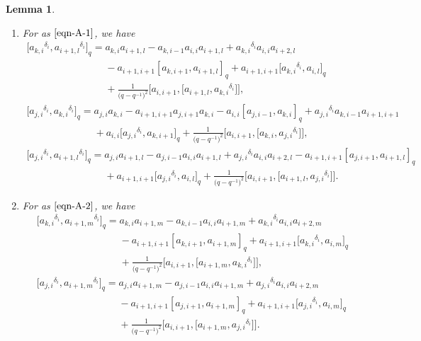 \documentclass[pdftex]{sigma}
\numberwithin{equation}{section}
\def\lr#1{\left[#1\right]}
\def\d{\delta}
\def\A{\mathscr{A}}
\newtheorem{Lemma}[Theorem]{Lemma}
\begin{document}
\begin{Lemma}
\begin{enumerate}
\begin{gather}
\end{gather}
\item[$(2)$] For \smash{$\A_{j,k,i+1}^{k-1,i,l}$} as $\eqref{eqn-A-1}$, we have
\begin{gather}
\bigl[{a_{k,i}}^{\d_i},{a_{i+1,l}}^{\d_i}\bigr]_q
=a_{k,i}a_{i+1,l}-a_{k,i-1}a_{i,i}a_{i+1,l} +{a_{k,i}}^{\d_i}a_{i,i}a_{i+2,l}\nonumber \\
\phantom{\bigl[{a_{k,i}}^{\d_i},{a_{i+1,l}}^{\d_i}\bigr]_q
=}{}-a_{i+1,i+1}\lr{a_{k,i+1},a_{i+1,l}}_q
+a_{i+1,i+1}\bigl[{a_{k,i}}^{\d_i},a_{i,l}\bigr]_q\nonumber \\
\phantom{\bigl[{a_{k,i}}^{\d_i},{a_{i+1,l}}^{\d_i}\bigr]_q
=}{} +\frac{1}{\bigl(q-q^{-1}\bigr)^2}\bigl[a_{i,i+1},\bigl[a_{i+1,l},{a_{k,i}}^{\d_i}\bigr]\bigr], \label{ri-1} \\
\bigl[{a_{j,i}}^{\d_i},{a_{k,i}}^{\d_i}\bigr]_q=a_{j,i}a_{k,i} -a_{i+1,i+1}a_{j,i+1}a_{k,i}-a_{i,i}\lr{a_{j,i-1},a_{k,i}}_q +{a_{j,i}}^{\d_i}a_{k,i-1}a_{i+1,i+1}\nonumber \\
\phantom{\bigl[{a_{j,i}}^{\d_i},{a_{k,i}}^{\d_i}\bigr]_q=}{}
+a_{i,i}\bigl[{a_{j,i}}^{\d_i}, a_{k,i+1}]_q +\frac{1}{\bigl(q-q^{-1}\bigr)^2}\bigl[a_{i,i+1},\bigl[a_{k,i},{a_{j,i}}^{\d_i}\bigr]\bigr], \label{ri-2} \\
\bigl[{a_{j,i}}^{\d_i}, {a_{i+1,l}}^{\d_i}\bigr]_q = a_{j,i}a_{i+1,l} -a_{j,i-1}a_{i,i}a_{i+1,l}+{a_{j,i}}^{\d_i}a_{i,i}a_{i+2,l} -a_{i+1,i+1}[a_{j,i+1},a_{i+1,l}]_q\nonumber \\
\phantom{\bigl[{a_{j,i}}^{\d_i}, {a_{i+1,l}}^{\d_i}\bigr]_q = }{}
+a_{i+1,i+1}\bigl[{a_{j,i}}^{\d_i},a_{i,l}\bigr]_q +\frac{1}{\bigl(q-q^{-1}\bigr)^2}\bigl[a_{i,i+1},\bigl[a_{i+1,l},{a_{j,i}}^{\d_i}\bigr]\bigr]. \label{ri-3}
\end{gather}
\item[$(3)$] For \smash{$\A_{j,k,i+1}^{i,l,m}$} as $\eqref{eqn-A-2}$, we have
\begin{gather}%
\bigl[{a_{k,i}}^{\d_i},{a_{i+1,m}}^{\d_i} \bigr]_q=a_{k,i}a_{i+1,m} -a_{k,i-1}a_{i,i}a_{i+1,m}+{a_{k,i}}^{\d_i}a_{i,i}a_{i+2,m}\nonumber \\
\phantom{\bigl[{a_{k,i}}^{\d_i},{a_{i+1,m}}^{\d_i} \bigr]_q=}{}
 -a_{i+1,i+1}\lr{a_{k,i+1},a_{i+1,m}}_q
+a_{i+1,i+1}\bigl[{a_{k,i}}^{\d_i},a_{i,m}\bigr]_q
\nonumber \\
\phantom{\bigl[{a_{k,i}}^{\d_i},{a_{i+1,m}}^{\d_i} \bigr]_q=}{}
+\frac{1}{\bigl(q-q^{-1}\bigr)^2}\bigl[a_{i,i+1},\bigl[a_{i+1,m},{a_{k,i}}^{\d_i}\bigr]\bigr], \label{ri-4} \\
\bigl[{a_{j,i}}^{\d_i},{a_{i+1,m}}^{\d_i}\bigr]_q=a_{j,i}a_{i+1,m} -a_{j,i-1}a_{i,i}a_{i+1,m}+{a_{j,i}}^{\d_i}a_{i,i}a_{i+2,m}\nonumber \\
\phantom{\bigl[{a_{j,i}}^{\d_i},{a_{i+1,m}}^{\d_i}\bigr]_q=}{}
 -a_{i+1,i+1}\lr{a_{j,i+1},a_{i+1,m}}_q+a_{i+1,i+1}\bigl[{a_{j,i}}^{\d_i},a_{i,m}\bigr]_q
 \nonumber \\
\phantom{\bigl[{a_{j,i}}^{\d_i},{a_{i+1,m}}^{\d_i}\bigr]_q=}{}
+\frac{1}{\bigl(q-q^{-1}\bigr)^2}\bigl[a_{i,i+1},\bigl[a_{i+1,m},{a_{j,i}}^{\d_i}\bigr]\bigr].\nonumber
\end{gather}
\end{enumerate}
\end{Lemma}
\end{document}
